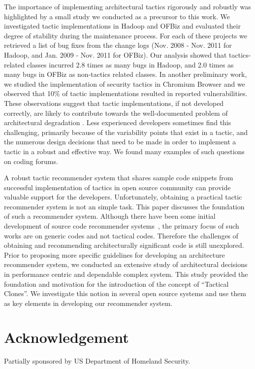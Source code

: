\documentclass[conference]{IEEEtran}
\begin{document}
The importance of implementing architectural tactics rigorously and robustly was highlighted by a small study we conducted as a precursor to this work. We investigated tactic implementations in Hadoop  and OFBiz and evaluated their degree of stability during the maintenance process. For each of these projects we retrieved a list of bug fixes from the change logs (Nov. 2008 - Nov. 2011 for Hadoop, and Jan. 2009 - Nov. 2011 for OFBiz). Our analysis showed that tactics-related classes incurred 2.8 times as many bugs in Hadoop, and 2.0 times as many bugs in OFBiz as non-tactics related classes. In another preliminary work, we studied the implementation of security tactics in Chromium Browser and we observed that 10\% of tactic implementations resulted in reported  vulnerabilities. These observations suggest that tactic implementations, if not developed correctly, are likely to contribute towards the well-documented problem of architectural degradation \cite{Erosion}. Less experienced developers sometimes find this challenging, primarily because of the variability points that exist in a tactic, and the numerous design decisions that need to be made in order to implement a tactic in a robust and effective way. We found many examples of such questions on coding forums.

A robust tactic recommender system that shares sample code snippets from successful implementation of tactics in open source community can provide valuable support for the developers. Unfortunately, obtaining a practical tactic recommender system is not an simple task. This paper discusses the foundation of such a recommender system. Although there have been some initial development of source code recommender systems~\cite{DBLP:conf/icse/McMillanHPCM12,6340250}, the primary focus of such works are on generic codes and not tactical codes. Therefore the challenges of obtaining and recommending architecturally significant code is still unexplored.
Prior to proposing more specific guidelines for developing an architecture recommender system, we conducted an extensive study of architectural decisions in performance centric and dependable complex system. This study provided the foundation and motivation for the introduction of the concept of ``Tactical Clones''. We investigate this notion in several open source systems and use them as key elements in developing our recommender system.
\vspace{-10pt}






\section*{Acknowledgement}
\small
Partially sponsored by US Department of Homeland Security.







\end{document}

